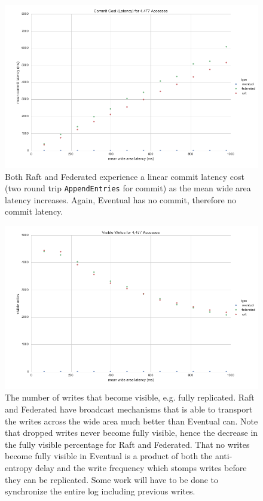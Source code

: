 \documentclass[11pt,letterpaper]{article}
\begin{document}
\begin{figure}[!h]
    \centering
        \includegraphics[width=\textwidth]{figures/commit_latency.png}
        \caption{\textsf{Both Raft and Federated experience a linear commit latency cost (two round trip \texttt{AppendEntries} for commit) as the mean wide area latency increases. Again, Eventual has no commit, therefore no commit latency.}}
        \label{fig:commit_latency}
\end{figure}

\begin{figure}[!h]
    \centering
        \includegraphics[width=\textwidth]{figures/visible_writes.png}
        \caption{\textsf{The number of writes that become visible, e.g. fully replicated. Raft and Federated have broadcast mechanisms that is able to transport the writes across the wide area much better than Eventual can. Note that dropped writes never become fully visible, hence the decrease in the fully visible percentage for Raft and Federated. That no writes become fully visible in Eventual is a product of both the anti-entropy delay and the write frequency which stomps writes before they can be replicated. Some work will have to be done to synchronize the entire log including previous writes.}}
        \label{fig:visible_writes}
\end{figure}
\end{document}
